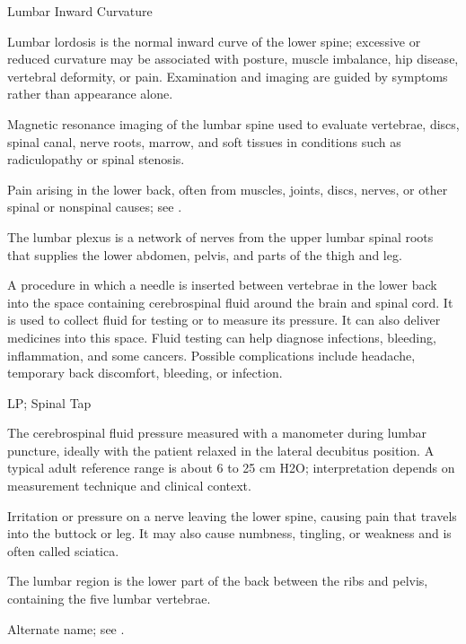 \synonyms
Lumbar Inward Curvature

 Lumbar lordosis is the normal inward curve of the lower spine; excessive or reduced curvature may be associated with posture, muscle imbalance, hip disease, vertebral deformity, or pain. Examination and imaging are guided by symptoms rather than appearance alone.

 Magnetic resonance imaging of the lumbar spine used to evaluate vertebrae, discs, spinal canal, nerve roots, marrow, and soft tissues in conditions such as radiculopathy or spinal stenosis.

 Pain arising in the lower back, often from muscles, joints, discs, nerves, or other spinal or nonspinal causes; see .

 The lumbar plexus is a network of nerves from the upper lumbar spinal roots that supplies the lower abdomen, pelvis, and parts of the thigh and leg.

 A procedure in which a needle is inserted between vertebrae in the lower back into the space containing cerebrospinal fluid around the brain and spinal cord. It is used to collect fluid for testing or to measure its pressure. It can also deliver medicines into this space. Fluid testing can help diagnose infections, bleeding, inflammation, and some cancers. Possible complications include headache, temporary back discomfort, bleeding, or infection.

\synonyms
LP; Spinal Tap

 The cerebrospinal fluid pressure measured with a manometer during lumbar puncture, ideally with the patient relaxed in the lateral decubitus position. A typical adult reference range is about 6 to 25 cm H2O; interpretation depends on measurement technique and clinical context.

 Irritation or pressure on a nerve leaving the lower spine, causing pain that travels into the buttock or leg. It may also cause numbness, tingling, or weakness and is often called sciatica.

 The lumbar region is the lower part of the back between the ribs and pelvis, containing the five lumbar vertebrae.

 Alternate name; see .

